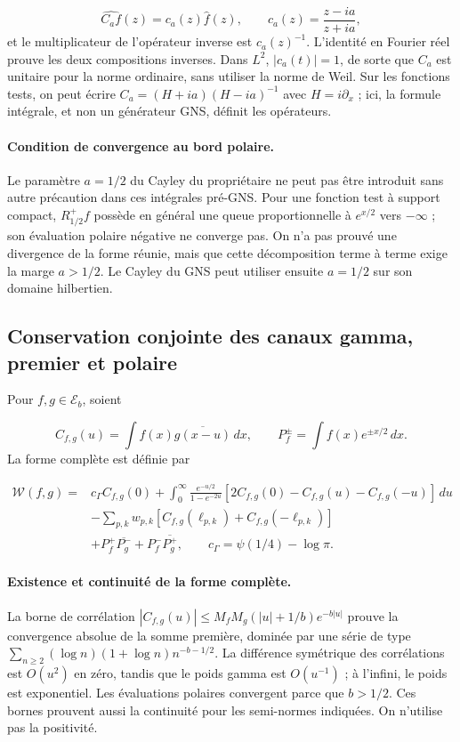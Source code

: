 \[
\widehat{C_af}(z)=c_a(z)\widehat f(z),\qquad
c_a(z)=\frac{z-ia}{z+ia},
\]
et le multiplicateur de l'opérateur inverse est \(c_a(z)^{-1}\). L'identité en Fourier réel prouve les deux compositions inverses. Dans \(L^2\), \(|c_a(t)|=1\), de sorte que \(C_a\) est unitaire pour la norme ordinaire, sans utiliser la norme de Weil. Sur les fonctions tests, on peut écrire \(C_a=(H+ia)(H-ia)^{-1}\) avec \(H=i\partial_x\) ; ici, la formule intégrale, et non un générateur GNS, définit les opérateurs.

\paragraph{Condition de convergence au bord polaire.} Le paramètre \(a=1/2\) du Cayley du propriétaire ne peut pas être introduit sans autre précaution dans ces intégrales pré-GNS. Pour une fonction test à support compact, \(R_{1/2}^+f\) possède en général une queue proportionnelle à \(e^{x/2}\) vers \(-\infty\) ; son évaluation polaire négative ne converge pas. On n'a pas prouvé une divergence de la forme réunie, mais que cette décomposition terme à terme exige la marge \(a>1/2\). Le Cayley du GNS peut utiliser ensuite \(a=1/2\) sur son domaine hilbertien.


\subsection{Conservation conjointe des canaux gamma, premier et polaire}
\label{tm-add-m5}
Pour \(f,g\in\mathscr E_b\), soient

\[
C_{f,g}(u)=\int f(x)\overline{g(x-u)}\,dx,
\qquad P_f^\pm=\int f(x)e^{\pm x/2}\,dx.
\]
La forme complète est définie par

\[
\begin{aligned}
\mathscr W(f,g)={}&c_\Gamma C_{f,g}(0)
+\int_0^\infty\frac{e^{-u/2}}{1-e^{-2u}}
 [2C_{f,g}(0)-C_{f,g}(u)-C_{f,g}(-u)]\,du\\
&-\sum_{p,k}w_{p,k}
 [C_{f,g}(\ell_{p,k})+C_{f,g}(-\ell_{p,k})]\\
&+P_f^+\overline{P_g^-}+P_f^-\overline{P_g^+},
\qquad c_\Gamma=\psi(1/4)-\log\pi.
\end{aligned}
\]
\paragraph{Existence et continuité de la forme complète.} La borne de corrélation \(|C_{f,g}(u)|\le M_fM_g(|u|+1/b)e^{-b|u|}\) prouve la convergence absolue de la somme première, dominée par une série de type \(\sum_{n\ge2}(\log n)(1+\log n)n^{-b-1/2}\). La différence symétrique des corrélations est \(O(u^2)\) en zéro, tandis que le poids gamma est \(O(u^{-1})\) ; à l'infini, le poids est exponentiel. Les évaluations polaires convergent parce que \(b>1/2\). Ces bornes prouvent aussi la continuité pour les semi-normes indiquées. On n'utilise pas la positivité.

